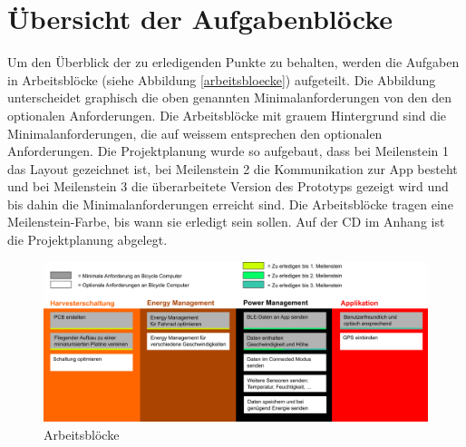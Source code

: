 \section{Übersicht der Aufgabenblöcke}

Um den Überblick der zu erledigenden Punkte zu behalten, werden die Aufgaben in Arbeitsblöcke (siehe Abbildung \ref{arbeitsbloecke}) aufgeteilt. Die Abbildung unterscheidet graphisch die oben genannten Minimalanforderungen von den den optionalen Anforderungen. Die Arbeitsblöcke mit grauem Hintergrund sind die Minimalanforderungen, die auf weissem entsprechen den optionalen Anforderungen. Die Projektplanung wurde so aufgebaut, dass bei Meilenstein 1 das Layout gezeichnet ist, bei Meilenstein 2 die Kommunikation zur App besteht und bei Meilenstein 3 die überarbeitete Version des Prototyps gezeigt wird und bis dahin die Minimalanforderungen erreicht sind. Die Arbeitsblöcke tragen eine Meilenstein-Farbe, bis wann sie erledigt sein sollen. Auf der CD im Anhang ist die Projektplanung abgelegt.


\begin{figure}[ht]
    \includegraphics[width=1.0\textwidth]{1Einleitung/Arbeitsbloecke.png} 
    \caption{Arbeitsblöcke}
\end{figure}\label{arbeitsbloecke} 

